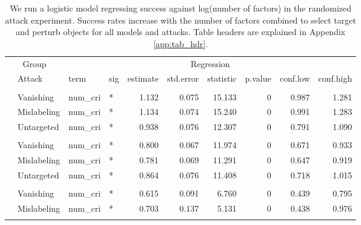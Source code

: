 \documentclass[
]{article}
\begin{document}
\begin{longtable}[t]{llllrrrrrr}
\caption{\label{tab:num_cri_table}We run a logistic model regressing success against log(number of factors) in the randomized attack experiment. Success rates increase with the number of factors combined to select target and perturb objects for all models and attacks. Table headers are explained in Appendix \ref{app:tab_hdr}.}\\
\toprule
\multicolumn{2}{c}{Group} & \multicolumn{8}{c}{Regression} \\
\cmidrule(l{3pt}r{3pt}){1-2} \cmidrule(l{3pt}r{3pt}){3-10}
 & Attack & term & sig & estimate & std.error & statistic & p.value & conf.low & conf.high\\
\midrule
\addlinespace[0.3em]
\multicolumn{10}{l}{\textbf{YOLOv3}}\\
\hspace{1em} & Vanishing & num\_cri & * & 1.132 & 0.075 & 15.133 & 0 & 0.987 & 1.281\\
\cmidrule{2-10}\nopagebreak
\hspace{1em} & Mislabeling & num\_cri & * & 1.134 & 0.074 & 15.240 & 0 & 0.991 & 1.283\\
\cmidrule{2-10}\nopagebreak
\hspace{1em} & Untargeted & num\_cri & * & 0.938 & 0.076 & 12.307 & 0 & 0.791 & 1.090\\
\cmidrule{1-10}\pagebreak[0]
\addlinespace[0.3em]
\multicolumn{10}{l}{\textbf{SSD}}\\
\hspace{1em} & Vanishing & num\_cri & * & 0.800 & 0.067 & 11.974 & 0 & 0.671 & 0.933\\
\cmidrule{2-10}\nopagebreak
\hspace{1em} & Mislabeling & num\_cri & * & 0.781 & 0.069 & 11.291 & 0 & 0.647 & 0.919\\
\cmidrule{2-10}\nopagebreak
\hspace{1em} & Untargeted & num\_cri & * & 0.864 & 0.076 & 11.408 & 0 & 0.718 & 1.015\\
\cmidrule{1-10}\pagebreak[0]
\addlinespace[0.3em]
\multicolumn{10}{l}{\textbf{RetinaNet}}\\
\hspace{1em} & Vanishing & num\_cri & * & 0.615 & 0.091 & 6.760 & 0 & 0.439 & 0.795\\
\cmidrule{2-10}\nopagebreak
\hspace{1em} & Mislabeling & num\_cri & * & 0.703 & 0.137 & 5.131 & 0 & 0.438 & 0.976\\
\cmidrule{2-10}\nopagebreak

\end{longtable}
\end{document}
